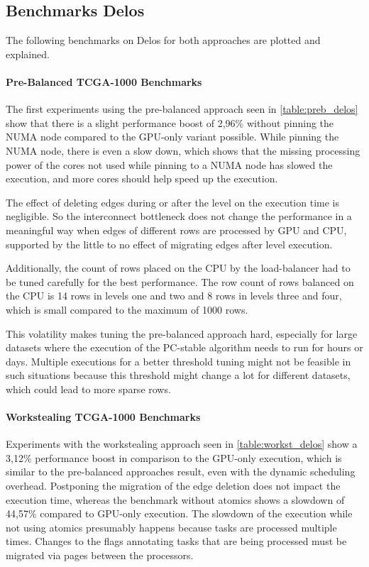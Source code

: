 \subsection{Benchmarks Delos}
The following benchmarks on Delos for both approaches are plotted and explained.

\paragraph{Pre-Balanced TCGA-1000 Benchmarks}

The first experiments using the pre-balanced approach seen in \ref{table:preb_delos} show that there is a slight performance boost of 2,96\% without pinning the NUMA node compared to the GPU-only variant possible. While pinning the NUMA node, there is even a slow down, which shows that the missing processing power of the cores not used while pinning to a NUMA node has slowed the execution, and more cores should help speed up the execution. 

The effect of deleting edges during or after the level on the execution time is negligible. So the interconnect bottleneck does not change the performance in a meaningful way when edges of different rows are processed by GPU and CPU, supported by the little to no effect of migrating edges after level execution. 

Additionally, the count of rows placed on the CPU by the load-balancer had to be tuned carefully for the best performance. The row count of rows balanced on the CPU is 14 rows in levels one and two and 8 rows in levels three and four, which is small compared to the maximum of 1000 rows.

This volatility makes tuning the pre-balanced approach hard, especially for large datasets where the execution of the PC-stable algorithm needs to run for hours or days. Multiple executions for a better threshold tuning might not be feasible in such situations because this threshold might change a lot for different datasets, which could lead to more sparse rows.

\paragraph{Workstealing TCGA-1000 Benchmarks}

Experiments with the workstealing approach seen in \ref{table:workst_delos} show a 3,12\% performance boost in comparison to the GPU-only execution, which is similar to the pre-balanced approaches result, even with the dynamic scheduling overhead. Postponing the migration of the edge deletion does not impact the execution time, whereas the benchmark without atomics shows a slowdown of 44,57\% compared to GPU-only execution. The slowdown of the execution while not using atomics presumably happens because tasks are processed multiple times. Changes to the flags annotating tasks that are being processed must be migrated via pages between the processors.

